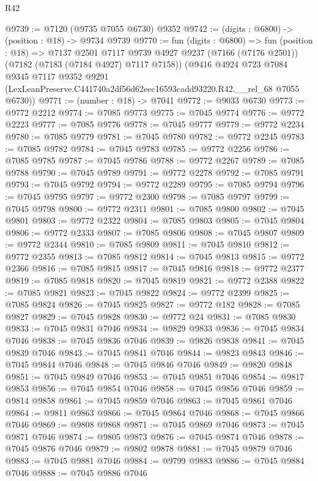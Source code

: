 \begin{lexlean}{R42}
\begin{coremodule}
{@9739 := @7120 (@9735 @7055 @6730) @9352
@9742 := (digits : @6800) -> (position : @18) -> @9734 @9739
@9770 := fun (digits : @6800) =>
  fun (position : @18) =>
  @7137
    @2501
    @7117
    @9739
    @4927
    @9237
    (@7166 (@7176 @2501))
    (@7182 (@7183 (@7184 @4927) @7117 @7158))
    (@9416
      @4924
      @723
      @7084
      @9345
      @7117
      @9352
      @9291
      (LexLeanPreserve.C441740a2df56d62eec16593cadd93220.R42.__rel_68 @7055 @6730))
@9771 := (number : @18) -> @7041
@9772 := @9033 @6730
@9773 := @9772 @2212
@9774 := @7085 @9773
@9775 := @7045 @9774
@9776 := @9772 @2223
@9777 := @7085 @9776
@9778 := @7045 @9777
@9779 := @9772 @2234
@9780 := @7085 @9779
@9781 := @7045 @9780
@9782 := @9772 @2245
@9783 := @7085 @9782
@9784 := @7045 @9783
@9785 := @9772 @2256
@9786 := @7085 @9785
@9787 := @7045 @9786
@9788 := @9772 @2267
@9789 := @7085 @9788
@9790 := @7045 @9789
@9791 := @9772 @2278
@9792 := @7085 @9791
@9793 := @7045 @9792
@9794 := @9772 @2289
@9795 := @7085 @9794
@9796 := @7045 @9795
@9797 := @9772 @2300
@9798 := @7085 @9797
@9799 := @7045 @9798
@9800 := @9772 @2311
@9801 := @7085 @9800
@9802 := @7045 @9801
@9803 := @9772 @2322
@9804 := @7085 @9803
@9805 := @7045 @9804
@9806 := @9772 @2333
@9807 := @7085 @9806
@9808 := @7045 @9807
@9809 := @9772 @2344
@9810 := @7085 @9809
@9811 := @7045 @9810
@9812 := @9772 @2355
@9813 := @7085 @9812
@9814 := @7045 @9813
@9815 := @9772 @2366
@9816 := @7085 @9815
@9817 := @7045 @9816
@9818 := @9772 @2377
@9819 := @7085 @9818
@9820 := @7045 @9819
@9821 := @9772 @2388
@9822 := @7085 @9821
@9823 := @7045 @9822
@9824 := @9772 @2399
@9825 := @7085 @9824
@9826 := @7045 @9825
@9827 := @9772 @182
@9828 := @7085 @9827
@9829 := @7045 @9828
@9830 := @9772 @24
@9831 := @7085 @9830
@9833 := @7045 @9831 @7046
@9834 := @9829 @9833
@9836 := @7045 @9834 @7046
@9838 := @7045 @9836 @7046
@9839 := @9826 @9838
@9841 := @7045 @9839 @7046
@9843 := @7045 @9841 @7046
@9844 := @9823 @9843
@9846 := @7045 @9844 @7046
@9848 := @7045 @9846 @7046
@9849 := @9820 @9848
@9851 := @7045 @9849 @7046
@9853 := @7045 @9851 @7046
@9854 := @9817 @9853
@9856 := @7045 @9854 @7046
@9858 := @7045 @9856 @7046
@9859 := @9814 @9858
@9861 := @7045 @9859 @7046
@9863 := @7045 @9861 @7046
@9864 := @9811 @9863
@9866 := @7045 @9864 @7046
@9868 := @7045 @9866 @7046
@9869 := @9808 @9868
@9871 := @7045 @9869 @7046
@9873 := @7045 @9871 @7046
@9874 := @9805 @9873
@9876 := @7045 @9874 @7046
@9878 := @7045 @9876 @7046
@9879 := @9802 @9878
@9881 := @7045 @9879 @7046
@9883 := @7045 @9881 @7046
@9884 := @9799 @9883
@9886 := @7045 @9884 @7046
@9888 := @7045 @9886 @7046
}
\end{coremodule}
\end{lexlean}
